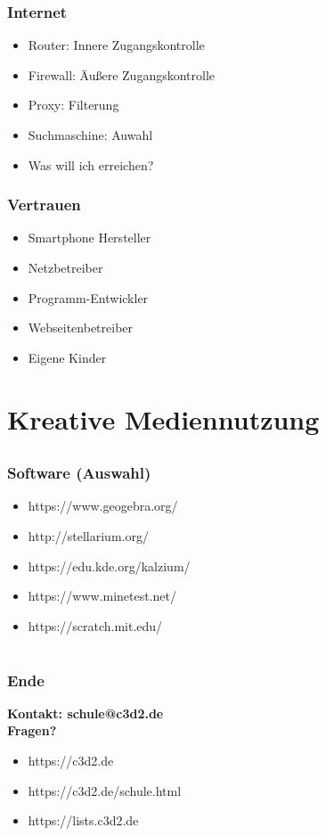 \documentclass[12pt]{beamer}
\begin{document}
\begin{frame}
	\frametitle{Internet}
	\begin{itemize}
		\item<1-> Router: Innere Zugangskontrolle
		\item<2-> Firewall: Äußere Zugangskontrolle
		\item<3-> Proxy: Filterung
		\item<4-> Suchmaschine: Auwahl
		\item<5-> Was will ich erreichen?
	\end{itemize}
\end{frame}

\begin{frame}
	\frametitle{Vertrauen}
	\begin{itemize}
		\item<1-> Smartphone Hersteller
		\item<2-> Netzbetreiber
		\item<3-> Programm-Entwickler
		\item<4-> Webseitenbetreiber
		\item<5-> Eigene Kinder
	\end{itemize}
\end{frame}


\section{Kreative Mediennutzung}
\subsection{}

\begin{frame}
	\frametitle{Software (Auswahl)}
	\begin{itemize}
		\item<1-> https://www.geogebra.org/
		\item<2-> http://stellarium.org/
		\item<3-> https://edu.kde.org/kalzium/
		\item<4-> https://www.minetest.net/
		\item<5-> https://scratch.mit.edu/
	\end{itemize}
\end{frame}


\section*{}
\subsection*{}

\begin{frame}
	\frametitle{Ende}
	\begin{center}
		\textbf{Kontakt: schule@c3d2.de} \\
		\textbf{Fragen?} 
	\end{center}
	\begin{itemize}
		\item<1-> https://c3d2.de
		\item<2-> https://c3d2.de/schule.html
		\item<3-> https://lists.c3d2.de
	\end{itemize}
\end{frame}
\end{document}
